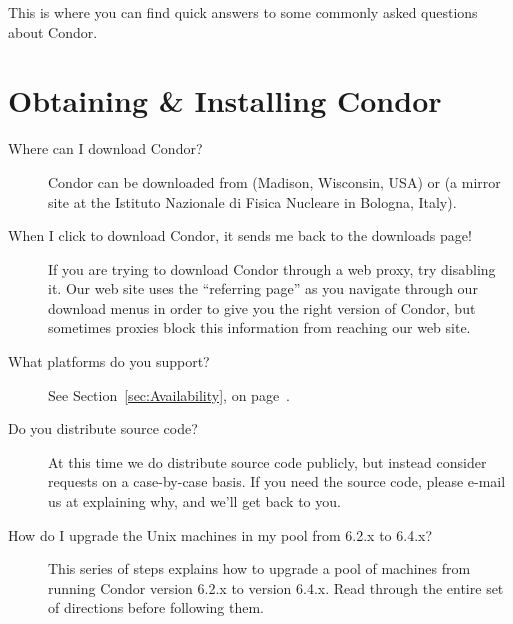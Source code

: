 

This is where you can find quick answers to some commonly asked
questions about Condor.

\section{Obtaining \& Installing Condor}

\begin{description}
\item[Where can I download Condor?]

Condor can be downloaded from
 (Madison, Wisconsin,
USA) or  (a mirror
site at the Istituto Nazionale di Fisica Nucleare in Bologna, Italy).

\item[When I click to download Condor, it sends me back to the downloads page!]

If you are trying to download Condor through a web proxy, try
disabling it.
Our web site uses the ``referring page'' as you navigate through our
download menus in order to give you the right version of Condor, but
sometimes proxies block this information from reaching our web site.

\item[What platforms do you support?]

See Section~\ref{sec:Availability}, on
page~\pageref{sec:Availability}.


\item[Do you distribute source code?]

At this time we do  distribute source code publicly, but
instead consider requests on a case-by-case basis.
If you need the source code, please e-mail us at
 explaining why, and we'll get back to
you.


\item[How do I upgrade the Unix machines in my pool from 6.2.x to 6.4.x?]

This series of steps explains how to upgrade a pool of machines
from running Condor version 6.2.x to version 6.4.x.
Read through the entire set of directions before following
them.


\end{description}
